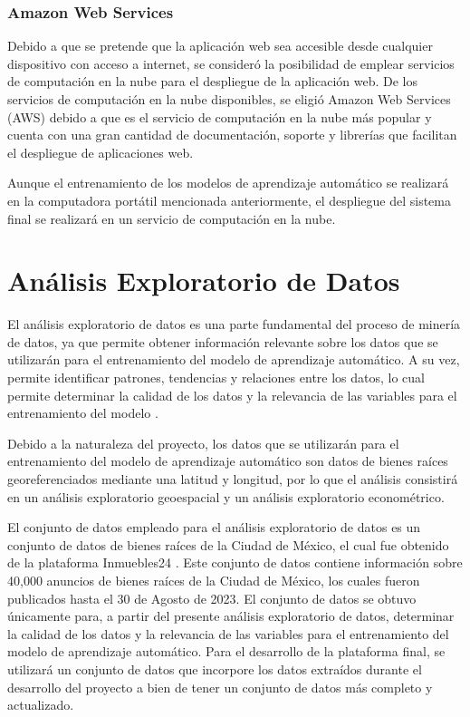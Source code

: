 \subsubsection{Amazon Web Services}

Debido a que se pretende que la aplicación web sea accesible desde cualquier
dispositivo con acceso a internet, se consideró la posibilidad de emplear
servicios de computación en la nube para el despliegue de la aplicación web.
De los servicios de computación en la nube disponibles, se eligió Amazon Web
Services (AWS) debido a que es el servicio de computación en la nube más
popular y cuenta con una gran cantidad de documentación, soporte y librerías
que facilitan el despliegue de aplicaciones web.

Aunque el entrenamiento de los modelos de aprendizaje automático se realizará
en la computadora portátil mencionada anteriormente, el despliegue del sistema
final se realizará en un servicio de computación en la nube.

\section{Análisis Exploratorio de Datos}

El análisis exploratorio de datos es una parte fundamental del proceso de
minería de datos, ya que permite obtener información relevante sobre los datos
que se utilizarán para el entrenamiento del modelo de aprendizaje automático.
A su vez, permite identificar patrones, tendencias y
relaciones entre los datos, lo cual permite determinar la calidad de los datos
y la relevancia de las variables para el entrenamiento del modelo \cite{stephan2009exploratory}.

Debido a la naturaleza del proyecto, los datos que se utilizarán para el
entrenamiento del modelo de aprendizaje automático son datos de bienes raíces
georeferenciados mediante una latitud y longitud, por lo que el análisis
consistirá en un análisis exploratorio geoespacial y un análisis exploratorio
econométrico.

El conjunto de datos empleado para el análisis exploratorio de datos es un
conjunto de datos de bienes raíces de la Ciudad de México, el cual fue obtenido
de la plataforma Inmuebles24 \cite{inmuebles24}. Este conjunto de datos contiene
información sobre 40,000 anuncios de bienes raíces de la Ciudad de México,
los cuales fueron publicados hasta el 30 de Agosto de 2023. El conjunto de datos
se obtuvo únicamente para, a partir del presente análisis exploratorio de datos,
determinar la calidad de los datos y la relevancia de las variables para el
entrenamiento del modelo de aprendizaje automático. Para el desarrollo de la
plataforma final, se utilizará un conjunto de datos que incorpore los datos
extraídos durante el desarrollo del proyecto a bien de tener un conjunto de
datos más completo y actualizado.


